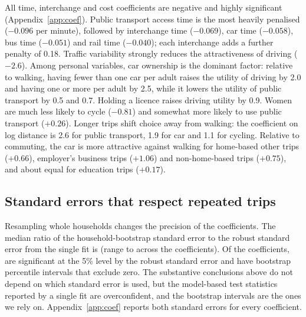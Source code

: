 \documentclass[11pt,a4paper]{article}
\newcommand{\tabpath}{tables/}
\begin{document}
\begin{table}[H]
\centering\small

\caption{Multinomial Logit specification ladder, estimated on the training years (54,766 trips). Walking is the reference mode. The likelihood-ratio statistic compares each model with the previous one.}
\label{tab:ladder}
\end{table}

All time, interchange and cost coefficients are negative and highly significant (Appendix~\ref{app:coef}). Public transport access time is the most heavily penalised ($-0.096$ per minute), followed by interchange time ($-0.069$), car time ($-0.058$), bus time ($-0.051$) and rail time ($-0.040$); each interchange adds a further penalty of 0.18. Traffic variability strongly reduces the attractiveness of driving ($-2.6$). Among personal variables, car ownership is the dominant factor: relative to walking, having fewer than one car per adult raises the utility of driving by 2.0 and having one or more per adult by 2.5, while it lowers the utility of public transport by 0.5 and 0.7. Holding a licence raises driving utility by 0.9. Women are much less likely to cycle ($-0.81$) and somewhat more likely to use public transport ($+0.26$). Longer trips shift choice away from walking: the coefficient on log distance is 2.6 for public transport, 1.9 for car and 1.1 for cycling. Relative to commuting, the car is more attractive against walking for home-based other trips ($+0.66$), employer's business trips ($+1.06$) and non-home-based trips ($+0.75$), and about equal for education trips ($+0.17$).

\subsection{Standard errors that respect repeated trips}
Resampling whole households changes the precision of the coefficients. The median ratio of the household-bootstrap standard error to the robust standard error from the single fit is \bootRatioMedian{} (range \bootRatioMin{} to \bootRatioMax{} across the \nCoef{} coefficients). Of the \nCoef{} coefficients, \bootSigRobust{} are significant at the 5\% level by the robust standard error and \bootSigBoot{} have bootstrap percentile intervals that exclude zero. The substantive conclusions above do not depend on which standard error is used, but the model-based test statistics reported by a single fit are overconfident, and the bootstrap intervals are the ones we rely on. Appendix~\ref{app:coef} reports both standard errors for every coefficient.
\end{document}
